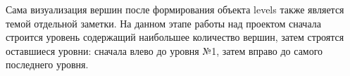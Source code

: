 Сама визуализация вершин после формирования объекта levels также является темой отдельной заметки. На данном этапе работы над проектом сначала строится уровень содержащий наибольшее количество вершин, затем строятся оставшиеся уровни: сначала влево до уровня №1, затем вправо до самого последнего уровня.

\noteattributes{}




